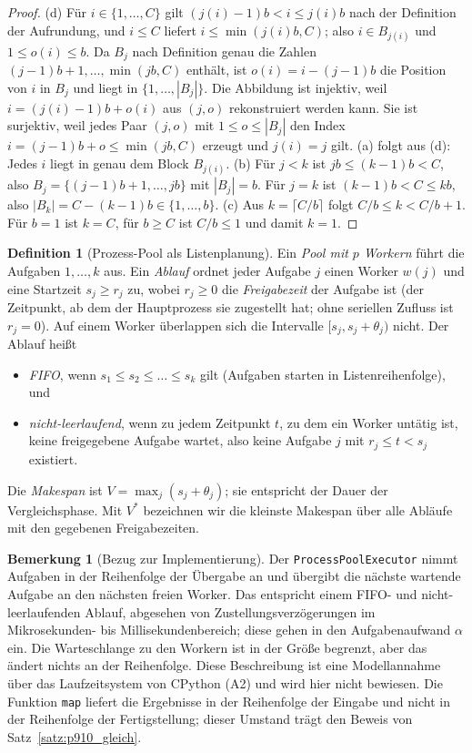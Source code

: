 \documentclass[a4paper,12pt, twoside]{report}
\theoremstyle{definition}
\newtheorem{definition}{Definition}
\newtheorem{bemerkung}{Bemerkung}
\begin{document}
\begin{proof}
(d) Für $i\in\{1,\dots,C\}$ gilt $(j(i)-1)b<i\le j(i)b$ nach der Definition der Aufrundung, und $i\le C$ liefert $i\le\min(j(i)b,C)$; also $i\in B_{j(i)}$ und $1\le o(i)\le b$. Da $B_j$ nach Definition genau die Zahlen $(j-1)b+1,\dots,\min(jb,C)$ enthält, ist $o(i)=i-(j-1)b$ die Position von $i$ in $B_j$ und liegt in $\{1,\dots,|B_j|\}$. Die Abbildung ist injektiv, weil $i=(j(i)-1)b+o(i)$ aus $(j,o)$ rekonstruiert werden kann. Sie ist surjektiv, weil jedes Paar $(j,o)$ mit $1\le o\le|B_j|$ den Index $i=(j-1)b+o\le\min(jb,C)$ erzeugt und $j(i)=j$ gilt.
(a) folgt aus (d): Jedes $i$ liegt in genau dem Block $B_{j(i)}$.
(b) Für $j<k$ ist $jb\le (k-1)b<C$, also $B_j=\{(j-1)b+1,\dots,jb\}$ mit $|B_j|=b$. Für $j=k$ ist $(k-1)b<C\le kb$, also $|B_k|=C-(k-1)b\in\{1,\dots,b\}$.
(c) Aus $k=\lceil C/b\rceil$ folgt $C/b\le k<C/b+1$. Für $b=1$ ist $k=C$, für $b\ge C$ ist $C/b\le 1$ und damit $k=1$.
\end{proof}

\begin{definition}[Prozess-Pool als Listenplanung]
\label{def:p910_pool}
Ein \emph{Pool mit $p$ Workern} führt die Aufgaben $1,\dots,k$ aus. Ein \emph{Ablauf} ordnet jeder Aufgabe $j$ einen Worker $w(j)$ und eine Startzeit $s_j\ge r_j$ zu, wobei $r_j\ge 0$ die \emph{Freigabezeit} der Aufgabe ist (der Zeitpunkt, ab dem der Hauptprozess sie zugestellt hat; ohne seriellen Zufluss ist $r_j=0$). Auf einem Worker überlappen sich die Intervalle $[s_j,s_j+\theta_j)$ nicht. Der Ablauf heißt
\begin{itemize}
\item \emph{FIFO}, wenn $s_1\le s_2\le\dots\le s_k$ gilt (Aufgaben starten in Listenreihenfolge), und
\item \emph{nicht-leerlaufend}, wenn zu jedem Zeitpunkt $t$, zu dem ein Worker untätig ist, keine freigegebene Aufgabe wartet, also keine Aufgabe $j$ mit $r_j\le t<s_j$ existiert.
\end{itemize}
Die \emph{Makespan} ist $V=\max_j(s_j+\theta_j)$; sie entspricht der Dauer der Vergleichsphase. Mit $V^\ast$ bezeichnen wir die kleinste Makespan über alle Abläufe mit den gegebenen Freigabezeiten.
\end{definition}

\begin{bemerkung}[Bezug zur Implementierung]
\label{bem:p910_modellbezug}
Der \texttt{ProcessPoolExecutor} nimmt Aufgaben in der Reihenfolge der Übergabe an und übergibt die nächste wartende Aufgabe an den nächsten freien Worker. Das entspricht einem FIFO- und nicht-leerlaufenden Ablauf, abgesehen von Zustellungsverzögerungen im Mikrosekunden- bis Millisekundenbereich; diese gehen in den Aufgabenaufwand $\alpha$ ein. Die Warteschlange zu den Workern ist in der Größe begrenzt, aber das ändert nichts an der Reihenfolge. Diese Beschreibung ist eine Modellannahme über das Laufzeitsystem von CPython (A2) und wird hier nicht bewiesen. Die Funktion \texttt{map} liefert die Ergebnisse in der Reihenfolge der Eingabe und nicht in der Reihenfolge der Fertigstellung; dieser Umstand trägt den Beweis von Satz~\ref{satz:p910_gleich}.
\end{bemerkung}
\end{document}
